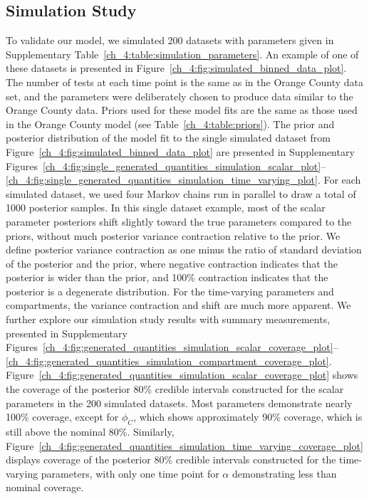 \subsection{Simulation Study}
To validate our model, we simulated 200 datasets with parameters given in Supplementary Table~\ref{ch_4:table:simulation_parameters}.
An example of one of these datasets is presented in Figure~\ref{ch_4:fig:simulated_binned_data_plot}.
The number of tests at each time point is the same as in the Orange County data set, and the parameters were deliberately chosen to produce data similar to the Orange County data.
Priors used for these model fits are the same as those used in the Orange County model (see Table~\ref{ch_4:table:priors}).
The prior and posterior distribution of the model fit to the single simulated dataset from Figure~\ref{ch_4:fig:simulated_binned_data_plot} are presented in Supplementary Figures~\ref{ch_4:fig:single_generated_quantities_simulation_scalar_plot}--\ref{ch_4:fig:single_generated_quantities_simulation_time_varying_plot}.
For each simulated dataset, we used four Markov chains run in parallel to draw a total of 1000 posterior samples.
In this single dataset example, most of the scalar parameter posteriors shift slightly toward the true parameters compared to the priors, without much posterior variance contraction relative to the prior.
We define posterior variance contraction as one minus the ratio of standard deviation of the posterior and the prior, where negative contraction indicates that the posterior is wider than the prior, and 100\% contraction indicates that the posterior is a degenerate distribution.
For the time-varying parameters and compartments, the variance contraction and shift are much more apparent.
We further explore our simulation study results with summary measurements, presented in Supplementary Figures~\ref{ch_4:fig:generated_quantities_simulation_scalar_coverage_plot}--\ref{ch_4:fig:generated_quantities_simulation_compartment_coverage_plot}.
Figure~\ref{ch_4:fig:generated_quantities_simulation_scalar_coverage_plot} shows the coverage of the posterior 80\% credible intervals constructed for the scalar parameters in the 200 simulated datasets.
Most parameters demonstrate nearly 100\% coverage, except for \( \phi_C \), which shows approximately 90\% coverage, which is still above the nominal 80\%.
Similarly, Figure~\ref{ch_4:fig:generated_quantities_simulation_time_varying_coverage_plot} displays coverage of the posterior 80\% credible intervals constructed for the time-varying parameters, with only one time point for \( \alpha \) demonstrating less than nominal coverage.
